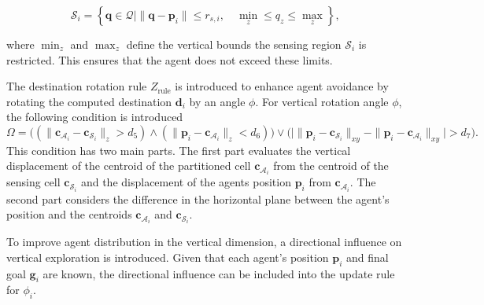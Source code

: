         \begin{equation}
            \mathcal{S}_i = \left\{\mathbf{q} \in \mathcal{Q} \mid \|\mathbf{q} - \mathbf{p}_i\| \leq r_{s,i}, \quad \min_z \leq q_z \leq \max_z \right\}\text{,}
        \end{equation}

        where $\min_z$ and $\max_z$ define the vertical bounds the sensing region $\mathcal{S}_i$ is restricted. 
        This ensures that the agent does not exceed these limits.

        The destination rotation rule $Z_{\text{rule}}$ is introduced to enhance agent avoidance by rotating the computed destination $\mathbf{d}_i$ by an angle $\phi$.
        For vertical rotation angle $\phi$, the following condition is introduced
        \begin{equation}
            \label{eqn:phi_condition}
            \Omega = \big( (\|\mathbf{c}_{\mathcal{A}_i} - \mathbf{c}_{\mathcal{S}_i}\|_z > d_5) \land (\|\mathbf{p}_i - \mathbf{c}_{\mathcal{A}_i}\|_z < d_6) \big) \lor 
            \big( \big| \|\mathbf{p}_i - \mathbf{c}_{\mathcal{S}_i}\|_{xy} - \|\mathbf{p}_i - \mathbf{c}_{\mathcal{A}_i}\|_{xy} \big| > d_7 \big) \text{.}
        \end{equation}
        This condition has two main parts. The first part evaluates the vertical displacement of the centroid of the partitioned cell $\mathbf{c}_{\mathcal{A}_i}$ from the centroid of the sensing cell $\mathbf{c}_{\mathcal{S}_i}$ and the
        displacement of the agents position $\mathbf{p}_i$ from $\mathbf{c}_{\mathcal{A}_i}$.
        The second part considers the difference in the horizontal plane between the agent's position and the centroids $\mathbf{c}_{\mathcal{A}_i}$ and $\mathbf{c}_{\mathcal{S}_i}$.

        To improve agent distribution in the vertical dimension, a directional influence on vertical exploration is introduced. 
        Given that each agent's position $\mathbf{p}_i$ and final goal $\mathbf{g}_i$ are known, the directional influence can be included into the update rule for $\phi_i$.

